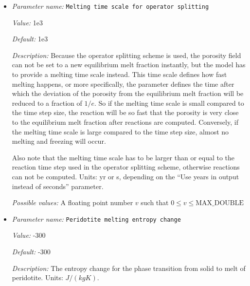 \begin{itemize}
{\it Description:} Depth above that melt will be extracted from the model, which is done by a negative reaction term proportional to the porosity field. Units: $m$.


{\it Possible values:} A floating point number $v$ such that $0 \leq v \leq \text{MAX\_DOUBLE}$
\item {\it Parameter name:} {\tt Melting time scale for operator splitting}
\label{parameters:Material model/Melt simple/Melting time scale for operator splitting}


{\it Value:} 1e3


{\it Default:} 1e3


{\it Description:} Because the operator splitting scheme is used, the porosity field can not be set to a new equilibrium melt fraction instantly, but the model has to provide a melting time scale instead. This time scale defines how fast melting happens, or more specifically, the parameter defines the time after which the deviation of the porosity from the equilibrium melt fraction will be reduced to a fraction of $1/e$. So if the melting time scale is small compared to the time step size, the reaction will be so fast that the porosity is very close to the equilibrium melt fraction after reactions are computed. Conversely, if the melting time scale is large compared to the time step size, almost no melting and freezing will occur.

Also note that the melting time scale has to be larger than or equal to the reaction time step used in the operator splitting scheme, otherwise reactions can not be computed. Units: yr or s, depending on the ``Use years in output instead of seconds'' parameter.


{\it Possible values:} A floating point number $v$ such that $0 \leq v \leq \text{MAX\_DOUBLE}$
\item {\it Parameter name:} {\tt Peridotite melting entropy change}
\label{parameters:Material model/Melt simple/Peridotite melting entropy change}


{\it Value:} -300


{\it Default:} -300


{\it Description:} The entropy change for the phase transition from solid to melt of peridotite. Units: $J/(kg K)$.



\end{itemize}
